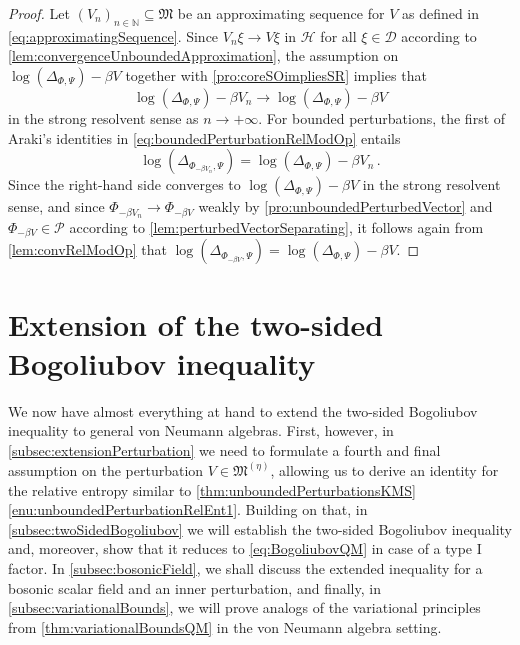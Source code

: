 \documentclass[a4paper, twoside, 11pt, reqno]{amsart}
\theoremstyle{definition}
\theoremstyle{plain}
\renewcommand{\subset}{\subseteq}
\renewcommand{\Delta}{\varDelta}
\renewcommand{\Phi}{\varPhi}
\renewcommand{\Psi}{\varPsi}
\newcommand{\N}{\mathbb{N}}
\newcommand{\MD}{\mathcal{D}}
\newcommand{\MH}{\mathcal{H}}
\newcommand{\MFM}{\mathfrak{M}}
\newcommand{\NPC}{\mathcal{P}}
\renewcommand{\AE}[1]{#1^{(\eta)}}
\newcommand{\1}{\mathbf{1}}
\begin{document}
\begin{proof}
    Let $(V_n)_{n \in \N} \subset \MFM$ be an approximating sequence for $V$ as defined in \cref{eq:approximatingSequence}. Since $V_n \xi \to V \xi$ in $\MH$ for all $\xi \in \MD$ according to \cref{lem:convergenceUnboundedApproximation}, the assumption on $\log(\Delta_{\Phi, \Psi}) - \beta V$ together with \cref{pro:coreSOimpliesSR} implies that
    \begin{equation*}
        \log(\Delta_{\Phi, \Psi}) - \beta V_n \to \log(\Delta_{\Phi, \Psi}) - \beta V
    \end{equation*}
    in the strong resolvent sense as $n \to + \infty$. For bounded perturbations, the first of Araki's identities in \cref{eq:boundedPerturbationRelModOp} entails
    \begin{equation*}
        \log(\Delta_{\Phi_{- \beta V_n}, \Psi}) = \log(\Delta_{\Phi, \Psi}) - \beta V_n \, .
    \end{equation*}
    Since the right-hand side converges to $\log(\Delta_{\Phi, \Psi}) - \beta V$ in the strong resolvent sense, and since $\Phi_{- \beta V_n} \to \Phi_{- \beta V}$ weakly by \cref{pro:unboundedPerturbedVector} and $\Phi_{- \beta V} \in \NPC$ according to \cref{lem:perturbedVectorSeparating}, it follows again from \cref{lem:convRelModOp} that $\log(\Delta_{\Phi_{- \beta V}, \Psi}) = \log(\Delta_{\Phi, \Psi}) - \beta V$.
\end{proof}



\section{Extension of the two-sided Bogoliubov inequality}\label{sec:extension}

We now have almost everything at hand to extend the two-sided Bogoliubov inequality to general von Neumann algebras. First, however, in \cref{subsec:extensionPerturbation} we need to formulate a fourth and final assumption on the perturbation $V \in \AE{\MFM}$, allowing us to derive an identity for the relative entropy similar to \cref{thm:unboundedPerturbationsKMS} \ref{enu:unboundedPerturbationRelEnt1}. Building on that, in \cref{subsec:twoSidedBogoliubov} we will establish the two-sided Bogoliubov inequality and, moreover, show that it reduces to \cref{eq:BogoliubovQM} in case of a type I factor. In \cref{subsec:bosonicField}, we shall discuss the extended inequality for a bosonic scalar field and an inner perturbation, and finally, in \cref{subsec:variationalBounds}, we will prove analogs of the variational principles from \cref{thm:variationalBoundsQM} in the von Neumann algebra setting.
\end{document}
